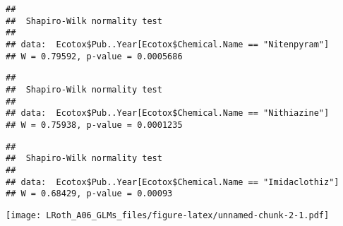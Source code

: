 \documentclass[]{article}
\newenvironment{Shaded}{\begin{snugshade}}{\end{snugshade}}
\newcommand{\KeywordTok}[1]{\textcolor[rgb]{0.13,0.29,0.53}{\textbf{#1}}}
\newcommand{\StringTok}[1]{\textcolor[rgb]{0.31,0.60,0.02}{#1}}
\newcommand{\CommentTok}[1]{\textcolor[rgb]{0.56,0.35,0.01}{\textit{#1}}}
\newcommand{\OperatorTok}[1]{\textcolor[rgb]{0.81,0.36,0.00}{\textbf{#1}}}
\newcommand{\NormalTok}[1]{#1}
\begin{document}
\begin{verbatim}
## 
##  Shapiro-Wilk normality test
## 
## data:  Ecotox$Pub..Year[Ecotox$Chemical.Name == "Nitenpyram"]
## W = 0.79592, p-value = 0.0005686
\end{verbatim}

\begin{Shaded}
\end{Shaded}

\begin{verbatim}
## 
##  Shapiro-Wilk normality test
## 
## data:  Ecotox$Pub..Year[Ecotox$Chemical.Name == "Nithiazine"]
## W = 0.75938, p-value = 0.0001235
\end{verbatim}

\begin{Shaded}
\end{Shaded}

\begin{verbatim}
## 
##  Shapiro-Wilk normality test
## 
## data:  Ecotox$Pub..Year[Ecotox$Chemical.Name == "Imidaclothiz"]
## W = 0.68429, p-value = 0.00093
\end{verbatim}

\begin{Shaded}
\end{Shaded}

\texttt{[image: LRoth\_A06\_GLMs\_files/figure-latex/unnamed-chunk-2-1.pdf]}
\end{document}
